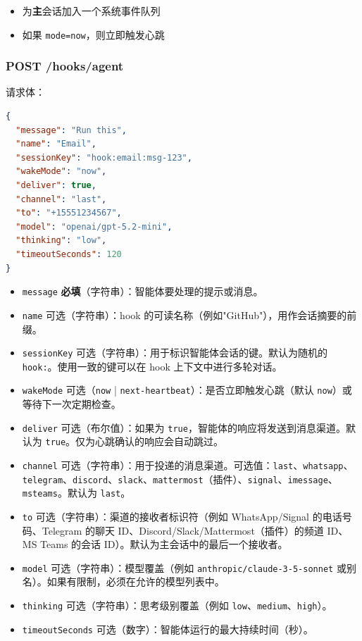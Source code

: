 \begin{itemize}
  \item 为\textbf{主}会话加入一个系统事件队列
  \item 如果 \texttt{mode=now}，则立即触发心跳
\end{itemize}


\subsubsection{POST /hooks/agent}


请求体：

\begin{lstlisting}[language=json]
{
  "message": "Run this",
  "name": "Email",
  "sessionKey": "hook:email:msg-123",
  "wakeMode": "now",
  "deliver": true,
  "channel": "last",
  "to": "+15551234567",
  "model": "openai/gpt-5.2-mini",
  "thinking": "low",
  "timeoutSeconds": 120
}
\end{lstlisting}


\begin{itemize}
  \item \texttt{message} \textbf{必填}（字符串）：智能体要处理的提示或消息。
  \item \texttt{name} 可选（字符串）：hook 的可读名称（例如"GitHub"），用作会话摘要的前缀。
  \item \texttt{sessionKey} 可选（字符串）：用于标识智能体会话的键。默认为随机的 \texttt{hook:}。使用一致的键可以在 hook 上下文中进行多轮对话。
  \item \texttt{wakeMode} 可选（\texttt{now} | \texttt{next-heartbeat}）：是否立即触发心跳（默认 \texttt{now}）或等待下一次定期检查。
  \item \texttt{deliver} 可选（布尔值）：如果为 \texttt{true}，智能体的响应将发送到消息渠道。默认为 \texttt{true}。仅为心跳确认的响应会自动跳过。
  \item \texttt{channel} 可选（字符串）：用于投递的消息渠道。可选值：\texttt{last}、\texttt{whatsapp}、\texttt{telegram}、\texttt{discord}、\texttt{slack}、\texttt{mattermost}（插件）、\texttt{signal}、\texttt{imessage}、\texttt{msteams}。默认为 \texttt{last}。
  \item \texttt{to} 可选（字符串）：渠道的接收者标识符（例如 WhatsApp/Signal 的电话号码、Telegram 的聊天 ID、Discord/Slack/Mattermost（插件）的频道 ID、MS Teams 的会话 ID）。默认为主会话中的最后一个接收者。
  \item \texttt{model} 可选（字符串）：模型覆盖（例如 \texttt{anthropic/claude-3-5-sonnet} 或别名）。如果有限制，必须在允许的模型列表中。
  \item \texttt{thinking} 可选（字符串）：思考级别覆盖（例如 \texttt{low}、\texttt{medium}、\texttt{high}）。
  \item \texttt{timeoutSeconds} 可选（数字）：智能体运行的最大持续时间（秒）。
\end{itemize}



